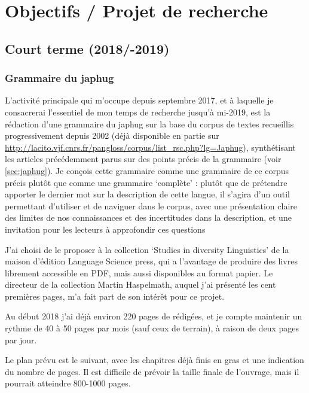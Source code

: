 \documentclass[oldfontcommands,oneside,a4paper,11pt]{article}
\begin{document}
\section{Objectifs / Projet de recherche}

\subsection{Court terme (2018/-2019)}

\subsubsection{Grammaire du japhug}
L'activité principale qui m'occupe depuis septembre 2017, et à laquelle je consacrerai l'essentiel de mon temps de recherche jusqu'à mi-2019, est la rédaction d'une grammaire du japhug sur la base du corpus de textes recueillis progressivement depuis 2002 (déjà disponible en partie sur \url{http://lacito.vjf.cnrs.fr/pangloss/corpus/list\_rsc.php?lg=Japhug}), synthétisant les articles précédemment parus sur des points précis de la grammaire (voir \ref{sec:japhug}). Je conçois cette grammaire comme une grammaire de ce corpus précis plutôt que comme une grammaire `complète' : plutôt que de prétendre apporter le dernier mot sur la description de cette langue, il s'agira d'un outil permettant d'utiliser et de naviguer dans le corpus, avec une présentation claire des limites de nos connaissances et des incertitudes dans la description, et une invitation pour les lecteurs à approfondir ces questions 

J'ai choisi de le proposer à la collection  `Studies in diversity Linguistics' de la maison d'édition Language Science press, qui a l'avantage de produire des livres librement accessible en PDF, mais aussi disponibles au format papier. Le directeur de la collection Martin Haspelmath, auquel j'ai présenté les cent premières pages, m'a fait part de son intérêt pour ce projet.

Au début 2018 j'ai déjà environ 220 pages de rédigées, et je compte maintenir un rythme de 40 à 50 pages par mois (sauf ceux de terrain), à raison de deux pages par jour.

Le plan prévu est le suivant, avec les chapitres déjà finis en gras et une indication du nombre de pages. Il est difficile de prévoir la taille finale de l'ouvrage, mais il pourrait atteindre 800-1000 pages.
\end{document}
